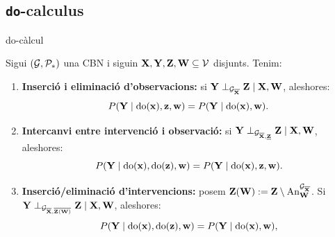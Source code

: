 \documentclass{bestbeamer}
\begin{document}
\subsection{\texorpdfstring{\texttt{do}-calculus}{do-calculus}}

\begin{frame}{do-càlcul}
\begin{theorem}\label{thm:docalculus}
Sigui $(\mathcal{G},\mathcal{P}_*)$ una CBN i siguin $\mathbf{X},\mathbf{Y},\mathbf{Z},\mathbf{W}\subseteq\mathcal{V}$ disjunts. Tenim:
\begin{enumerate}
    \item[\textit{(R1)}] \textbf{Inserció i eliminació d'observacions:} si $\mathbf{Y} \perp_{\mathcal{G}_{\overline{\mathbf{X}}}} \mathbf{Z} \mid \mathbf{X},\mathbf{W}$, aleshores:
    \begin{equation*}
    P(\mathbf{Y}\mid \operatorname{do}(\mathbf{x}),\mathbf{z},\mathbf{w})=P(\mathbf{Y}\mid \operatorname{do}(\mathbf{x}),\mathbf{w}).
    \end{equation*}
    \item[\textit{(R2)}] \textbf{Intercanvi entre intervenció i observació:} si $\mathbf{Y} \perp_{\mathcal{G}_{\overline{\mathbf{X}},\underline{\mathbf{Z}}}} \mathbf{Z} \mid \mathbf{X},\mathbf{W}$, aleshores:
    \begin{equation*}
    P(\mathbf{Y}\mid \operatorname{do}(\mathbf{x}),\operatorname{do}(\mathbf{z}),\mathbf{w})=P(\mathbf{Y}\mid \operatorname{do}(\mathbf{x}),\mathbf{z},\mathbf{w}).
    \end{equation*}
    \item[\textit{(R3)}] \textbf{Inserció/eliminació d'intervencions:} posem $\mathbf{Z}(\mathbf{W}):=\mathbf{Z}\setminus \operatorname{An}_{\mathbf{W}}^{\mathcal{G}_{\overline{\mathbf{X}}}}$. Si $\mathbf{Y} \perp_{\mathcal{G}_{\overline{\mathbf{X}},\overline{\mathbf{Z}(\mathbf{W})}}} \mathbf{Z} \mid \mathbf{X},\mathbf{W}$, aleshores:
    \begin{equation*}
    P(\mathbf{Y}\mid \operatorname{do}(\mathbf{x}),\operatorname{do}(\mathbf{z}),\mathbf{w})=P(\mathbf{Y}\mid \operatorname{do}(\mathbf{x}),\mathbf{w}),
    \end{equation*}
\end{enumerate}
\end{theorem}
\end{frame}
\end{document}
